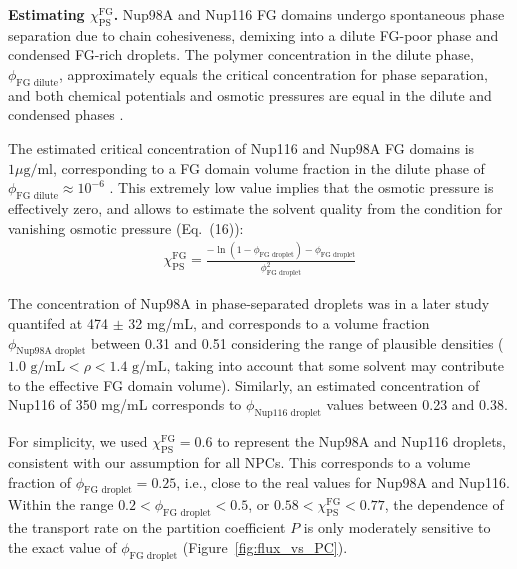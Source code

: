 \documentclass[10pt, a4paper, twocolumn]{article}
\begin{document}
\bigskip\noindent
\textbf{Estimating $\chi_\text{PS}^\text{FG}$.} 
Nup98A and Nup116 FG domains undergo spontaneous phase separation due to chain cohesiveness, demixing into a dilute FG-poor phase and condensed FG-rich droplets.
The polymer concentration in the dilute phase, $\phi_\text{FG dilute}$, approximately equals the critical concentration for phase separation, and both chemical potentials and osmotic pressures are equal in the dilute and condensed phases \cite{Vovk2016, Zilman2018}.

The estimated critical concentration of Nup116 and Nup98A FG domains is $1 \mu\text{g}/\text{ml}$, corresponding to a FG domain volume fraction in the dilute phase of $\phi_\text{FG dilute} \approx 10^{-6}$ \cite{Schmidt2015}.
This extremely low value implies that the osmotic pressure is effectively zero, and allows to estimate the solvent quality from the condition for vanishing osmotic pressure (Eq.~(16)):
\begin{eqnarray}
    \chi_{\text{PS}}^{\text{FG}} = \frac{-\ln(1-\phi_\text{FG droplet}) - \phi_\text{FG droplet}}{\phi_\text{FG droplet}^2}
\end{eqnarray}

The concentration of Nup98A in phase-separated droplets was in a later study \cite{Ng2023} quantifed at 474 $\pm$ 32 mg/mL, and corresponds to a volume fraction $\phi_\text{Nup98A droplet}$ between 0.31 and 0.51 considering the range of plausible densities ($1.0 \text{ g/mL} < \rho < 1.4 \text{ g/mL}$, taking into account that some solvent may contribute to the effective FG domain volume).
Similarly, an estimated concentration of Nup116 of 350 mg/mL \cite{Schmidt2015} corresponds to $\phi_\text{Nup116 droplet}$ values between 0.23 and 0.38.

For simplicity, we used $\chi_{\text{PS}}^{\text{FG}} = 0.6$ to represent the Nup98A and Nup116 droplets, consistent with our assumption for all NPCs.
This corresponds to a volume fraction of $\phi_\text{FG droplet} = 0.25$, i.e., close to the real values for Nup98A and Nup116.
Within the range $0.2 < \phi_\text{FG droplet} < 0.5$, or $0.58 < \chi_{\text{PS}}^{\text{FG}} < 0.77$, the dependence of the transport rate on the partition coefficient $P$ is only moderately sensitive to the exact value of $\phi_\text{FG droplet}$ (Figure~\ref{fig:flux_vs_PC}).
\end{document}
